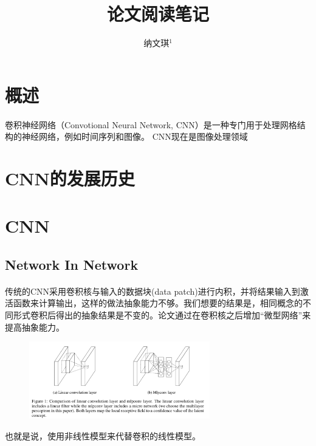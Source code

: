\documentclass[10pt,letterpaper]{article}
\begin{document}
 


\title{论文阅读笔记}

\author{纳文琪$^{1}$}

\maketitle

\section{概述}
\paragraph{} 卷积神经网络（Convotional Neural Network, CNN）是一种专门用于处理网格结构的神经网络，例如时间序列和图像。
CNN现在是图像处理领域
\section{CNN的发展历史}


\section{CNN}
\subsection{Network In Network\cite{networkinnetwor2013}}
\paragraph{} 传统的CNN采用卷积核与输入的数据块(data patch)进行内积，并将结果输入到激活函数来计算输出，这样的做法抽象能力不够。我们想要的结果是，相同概念的不同形式卷积后得出的抽象结果是不变的。论文通过在卷积核之后增加“微型网络”来提高抽象能力。
\begin{figure}[H] %
	\centering %
	\includegraphics[width=0.7\textwidth]{images/nin-1.png} %
	\caption{} %
	\label{Fig.main2} %
\end{figure}
也就是说，使用非线性模型来代替卷积的线性模型。
\end{document}
